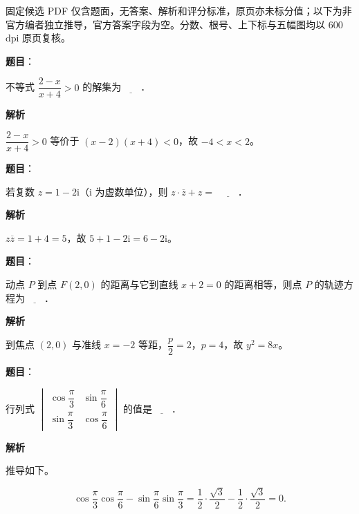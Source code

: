 

\begin{gktip}
固定候选 PDF 仅含题面，无答案、解析和评分标准，原页亦未标分值；以下为非官方编者独立推导，官方答案字段为空。分数、根号、上下标与五幅图均以 600 dpi 原页复核。
\end{gktip}

\begin{answer}

\textbf{题目}：

不等式 $\dfrac{2-x}{x+4}>0$ 的解集为$\underline{\qquad}$．

\textbf{解析}

$\dfrac{2-x}{x+4}>0$ 等价于 $(x-2)(x+4)<0$，故 $-4<x<2$。


\end{answer}
\begin{answer}

\textbf{题目}：

若复数 $z=1-2\mathrm i$（$\mathrm i$ 为虚数单位），则 $z\cdot\overline z+z=$ $\underline{\qquad}$．

\textbf{解析}

$z\overline z=1+4=5$，故 $5+1-2\mathrm i=6-2\mathrm i$。


\end{answer}
\begin{answer}

\textbf{题目}：

动点 $P$ 到点 $F(2,0)$ 的距离与它到直线 $x+2=0$ 的距离相等，则点 $P$ 的轨迹方程为$\underline{\qquad}$．

\textbf{解析}

到焦点 $(2,0)$ 与准线 $x=-2$ 等距，$\dfrac p2=2$，$p=4$，故 $y^2=8x$。


\end{answer}
\begin{answer}

\textbf{题目}：

行列式 $\begin{vmatrix}\cos\dfrac\pi3&\sin\dfrac\pi6\\ \sin\dfrac\pi3&\cos\dfrac\pi6\end{vmatrix}$ 的值是$\underline{\qquad}$．

\textbf{解析}

推导如下。

\nopagebreak[4]
\[\cos\frac\pi3\cos\frac\pi6-\sin\frac\pi6\sin\frac\pi3
=\frac12\cdot\frac{\sqrt3}2-\frac12\cdot\frac{\sqrt3}2=0.\]


\end{answer}

